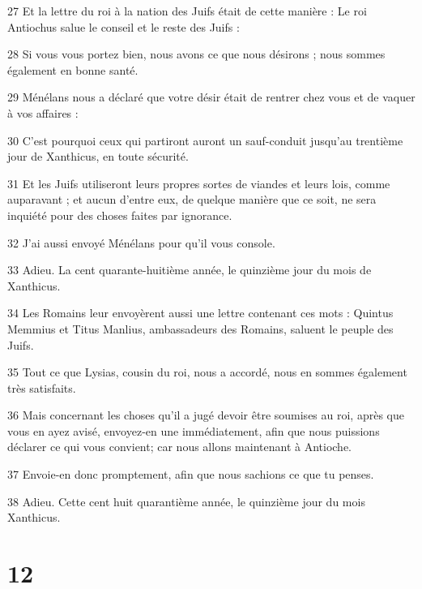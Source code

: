 \par 27 Et la lettre du roi à la nation des Juifs était de cette manière : Le roi Antiochus salue le conseil et le reste des Juifs :
\par 28 Si vous vous portez bien, nous avons ce que nous désirons ; nous sommes également en bonne santé.
\par 29 Ménélans nous a déclaré que votre désir était de rentrer chez vous et de vaquer à vos affaires :
\par 30 C'est pourquoi ceux qui partiront auront un sauf-conduit jusqu'au trentième jour de Xanthicus, en toute sécurité.
\par 31 Et les Juifs utiliseront leurs propres sortes de viandes et leurs lois, comme auparavant ; et aucun d'entre eux, de quelque manière que ce soit, ne sera inquiété pour des choses faites par ignorance.
\par 32 J'ai aussi envoyé Ménélans pour qu'il vous console.
\par 33 Adieu. La cent quarante-huitième année, le quinzième jour du mois de Xanthicus.
\par 34 Les Romains leur envoyèrent aussi une lettre contenant ces mots : Quintus Memmius et Titus Manlius, ambassadeurs des Romains, saluent le peuple des Juifs.
\par 35 Tout ce que Lysias, cousin du roi, nous a accordé, nous en sommes également très satisfaits.
\par 36 Mais concernant les choses qu'il a jugé devoir être soumises au roi, après que vous en ayez avisé, envoyez-en une immédiatement, afin que nous puissions déclarer ce qui vous convient; car nous allons maintenant à Antioche.
\par 37 Envoie-en donc promptement, afin que nous sachions ce que tu penses.
\par 38 Adieu. Cette cent huit quarantième année, le quinzième jour du mois Xanthicus.

\chapter{12}

